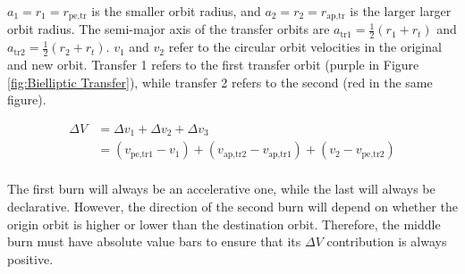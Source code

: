 \documentclass{article}
\begin{document}
$a_1=r_1=r_\text{pe,tr}$ is the smaller orbit radius, and $a_2=r_2=r_\text{ap,tr}$ is the larger larger orbit radius. The semi-major axis of the transfer orbits are $a_\text{tr1}=\frac{1}{2}(r_1+r_t)$ and $a_\text{tr2}=\frac{1}{2}(r_2+r_t)$. $v_1$ and $v_2$ refer to the circular orbit velocities in the original and new orbit. Transfer 1 refers to the first transfer orbit (purple in Figure \ref{fig:Bielliptic Transfer}), while transfer 2 refers to the second (red in the same figure).

\begin{align*}
    \Delta V & = \Delta v_1+\Delta v_2+\Delta v_3                                              \\
             & = (v_\text{pe,tr1}-v_1)+(v_\text{ap,tr2}-v_\text{ap,tr1})+(v_2-v_\text{pe,tr2}) \\
\end{align*}

The first burn will always be an accelerative one, while the last will always be declarative. However, the direction of the second burn will depend on whether the origin orbit is higher or lower than the destination orbit. Therefore, the middle burn must have absolute value bars to ensure that its $\Delta V$ contribution is always positive.
\end{document}
